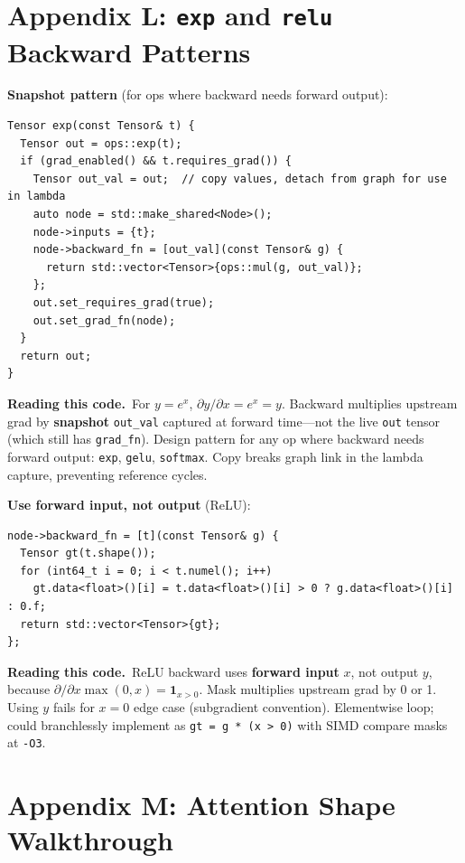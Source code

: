 \documentclass[11pt,a4paper]{article}
\newcommand{\explain}{\par\smallskip\noindent}
\newcommand{\exhead}{\textbf{Reading this code.}\ }
\begin{document}
\section{Appendix L: \texttt{exp} and \texttt{relu} Backward Patterns}
\label{app:unary-bwd}

\textbf{Snapshot pattern} (for ops where backward needs forward output):

\begin{lstlisting}[style=cpp]
Tensor exp(const Tensor& t) {
  Tensor out = ops::exp(t);
  if (grad_enabled() && t.requires_grad()) {
    Tensor out_val = out;  // copy values, detach from graph for use in lambda
    auto node = std::make_shared<Node>();
    node->inputs = {t};
    node->backward_fn = [out_val](const Tensor& g) {
      return std::vector<Tensor>{ops::mul(g, out_val)};
    };
    out.set_requires_grad(true);
    out.set_grad_fn(node);
  }
  return out;
}
\end{lstlisting}
\explain\exhead For $y = e^x$, $\partial y/\partial x = e^x = y$. Backward multiplies upstream
grad by \textbf{snapshot} \texttt{out\_val} captured at forward time---not the live \texttt{out}
tensor (which still has \texttt{grad\_fn}). Design pattern for any op where backward needs
forward output: \texttt{exp}, \texttt{gelu}, \texttt{softmax}. Copy breaks graph link in the
lambda capture, preventing reference cycles.

\textbf{Use forward input, not output} (ReLU):

\begin{lstlisting}[style=cpp]
node->backward_fn = [t](const Tensor& g) {
  Tensor gt(t.shape());
  for (int64_t i = 0; i < t.numel(); i++)
    gt.data<float>()[i] = t.data<float>()[i] > 0 ? g.data<float>()[i] : 0.f;
  return std::vector<Tensor>{gt};
};
\end{lstlisting}
\explain\exhead ReLU backward uses \textbf{forward input} $x$, not output $y$, because
$\partial/\partial x \max(0,x) = \mathbf{1}_{x>0}$. Mask multiplies upstream grad by 0 or 1.
Using $y$ fails for $x=0$ edge case (subgradient convention). Elementwise loop; could branchlessly
implement as \texttt{gt = g * (x > 0)} with SIMD compare masks at \texttt{-O3}.

\section{Appendix M: Attention Shape Walkthrough}
\label{app:attention-shapes}
\end{document}
